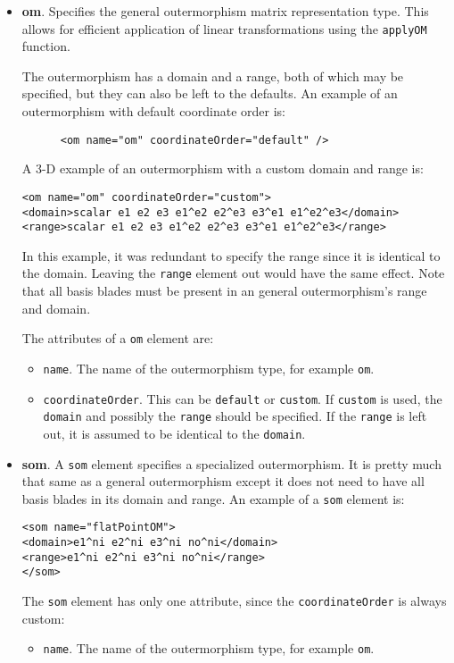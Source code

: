 \documentclass[10pt, a4paper]{article}
\begin{document}
\begin{itemize}
\item {\bf om}. Specifies the general outermorphism matrix representation type. This allows for efficient
      application of linear transformations using the {\tt applyOM} function.

      The outermorphism has a domain and
      a range, both of which may be specified, but they can also be left to the defaults. An example of an outermorphism with default
      coordinate order is:
      \begin{verbatim}
      <om name="om" coordinateOrder="default" />
      \end{verbatim}
      A 3-D example of an outermorphism with a custom domain and range is:
\begin{verbatim}
<om name="om" coordinateOrder="custom">
<domain>scalar e1 e2 e3 e1^e2 e2^e3 e3^e1 e1^e2^e3</domain>
<range>scalar e1 e2 e3 e1^e2 e2^e3 e3^e1 e1^e2^e3</range>
\end{verbatim}
      In this example, it was redundant to specify the range since it is identical to the domain. Leaving the {\tt range} element
      out would have the same effect. Note that all basis blades must be present in an general outermorphism's range and domain.
      
      The attributes of a {\tt om} element are:
       \begin{itemize}
       \item {\tt name}. The name of the outermorphism type, for example {\tt om}.
       \item {\tt coordinateOrder}. This can be {\tt default} or {\tt custom}. If {\tt custom} is used, the {\tt domain}
            and possibly the {\tt range} should be specified. If the {\tt range} is left out, it is assumed to be identical to the {\tt domain}.
       \end{itemize}
       
\item {\bf som}. A {\tt som} element specifies a specialized outermorphism. It is pretty much that same as a general outermorphism
      except it does not need to have all basis blades in its domain and range. An example of a {\tt som} element is:
\begin{verbatim}
<som name="flatPointOM">
<domain>e1^ni e2^ni e3^ni no^ni</domain>
<range>e1^ni e2^ni e3^ni no^ni</range> 
</som>
\end{verbatim}
      The {\tt som} element has only one attribute, since the {\tt coordinateOrder} is always custom:
       \begin{itemize}
       \item {\tt name}. The name of the outermorphism type, for example {\tt om}.
       \end{itemize}
       

\end{itemize}
\end{document}
